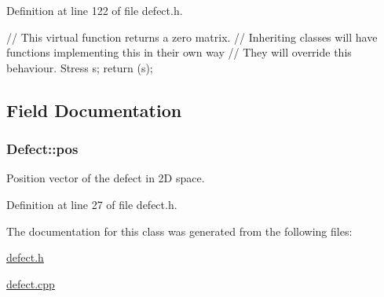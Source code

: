 \-Definition at line 122 of file defect.\-h.


\begin{DoxyCode}
  {
    // This virtual function returns a zero matrix.
    // Inheriting classes will have functions implementing this in their own
       way
    // They will override this behaviour.
    Stress s;
    return (s);
  }
\end{DoxyCode}


\subsection{\-Field \-Documentation}
\hypertarget{classDefect_aed2731c1beefc22e3db6ad5b18194cdd}{
\subsubsection[{pos}]{ {\bf \-Defect\-::pos}}}\label{d5/d4f/classDefect_aed2731c1beefc22e3db6ad5b18194cdd}


\-Position vector of the defect in 2\-D space. 



\-Definition at line 27 of file defect.\-h.



\-The documentation for this class was generated from the following files\-:\begin{DoxyCompactItemize}
\item 
\hyperlink{defect_8h}{defect.\-h}\item 
\hyperlink{defect_8cpp}{defect.\-cpp}\end{DoxyCompactItemize}
